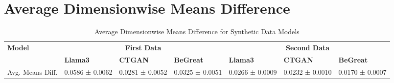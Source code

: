 \chapter*{Average Dimensionwise Means Difference}
\label{app:avg_dim_means_appendix}

\begin{table}[H]
    \centering
    \caption{Average Dimensionwise Means Difference for Synthetic Data Models}
    \label{tab:avg_means_diff_combined}
    \begin{tabularx}{\textwidth}{l*{6}{X}}
        \toprule
        \textbf{Model} & \multicolumn{3}{c}{\textbf{First Data}} & \multicolumn{3}{c}{\textbf{Second Data}} \\
        \cmidrule(lr){2-4} \cmidrule(lr){5-7}
        & \textbf{Llama3} & \textbf{CTGAN} & \textbf{BeGreat} & \textbf{Llama3} & \textbf{CTGAN} & \textbf{BeGreat} \\
        \midrule
        Avg. Means Diff. & 0.0586 ± 0.0062 & 0.0281 ± 0.0052 & 0.0325 ± 0.0051 & 0.0266 ± 0.0009 & 0.0232 ± 0.0010 & 0.0170 ± 0.0007 \\
        \bottomrule
    \end{tabularx}
    \end{table}
    
